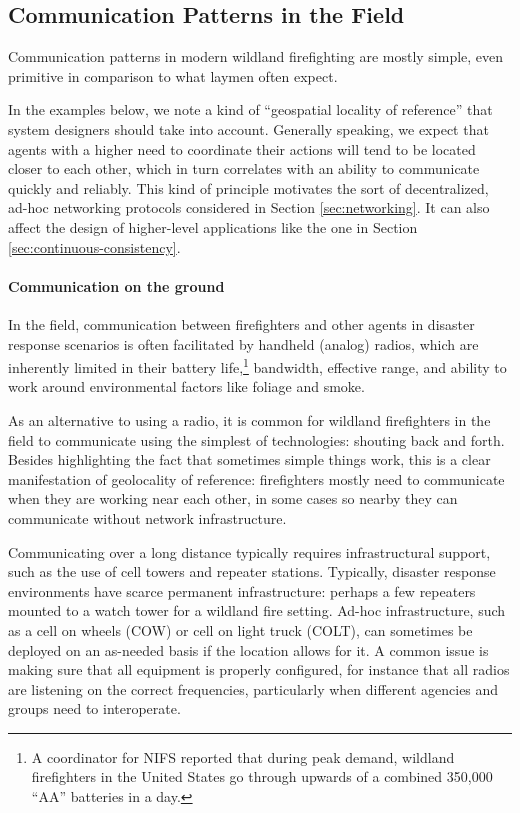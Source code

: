 \documentclass[]             %
{NASA}                       %
\theoremstyle{definition}
\begin{document}
\subsection{Communication Patterns in the Field}
\label{communication-in-practice}

Communication patterns in modern wildland firefighting are mostly
simple, even primitive in comparison to what laymen often expect.

In the examples below, we note a kind of ``geospatial locality of
reference'' that system designers should take into account. Generally
speaking, we expect that agents with a higher need to coordinate their
actions will tend to be located closer to each other, which in turn
correlates with an ability to communicate quickly and reliably. This
kind of principle motivates the sort of decentralized, ad-hoc networking
protocols considered in Section \ref{sec:networking}. It can also affect
the design of higher-level applications like the one in Section
\ref{sec:continuous-consistency}.

\paragraph{Communication on the ground}

In the field, communication between firefighters and other agents in
disaster response scenarios is often facilitated by handheld (analog)
radios, which are inherently limited in their battery life,\footnote{A
coordinator for NIFS reported that during peak demand, wildland
firefighters in the United States go through upwards of a combined
350,000 ``AA'' batteries in a day.} bandwidth, effective range, and
ability to work around environmental factors like foliage and smoke.

As an alternative to using a radio, it is common for wildland
firefighters in the field to communicate using the simplest of
technologies: shouting back and forth. Besides highlighting the fact
that sometimes simple things work, this is a clear manifestation of
geolocality of reference: firefighters mostly need to communicate when
they are working near each other, in some cases so nearby they can
communicate without network infrastructure.

Communicating over a long distance typically requires infrastructural
support, such as the use of cell towers and repeater
stations. Typically, disaster response environments have scarce
permanent infrastructure: perhaps a few repeaters mounted to a watch
tower for a wildland fire setting. Ad-hoc infrastructure, such as a
cell on wheels (COW) or cell on light truck (COLT), can sometimes be
deployed on an as-needed basis if the location allows for it. A common
issue is making sure that all equipment is properly configured, for
instance that all radios are listening on the correct frequencies,
particularly when different agencies and groups need to interoperate.
\end{document}
